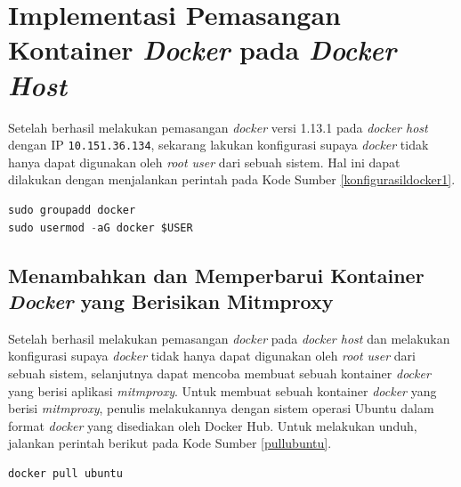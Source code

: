 \section{Implementasi Pemasangan Kontainer \textit{Docker} pada \textit{Docker Host}}
Setelah berhasil melakukan pemasangan \textit{docker} versi 1.13.1 pada \textit{docker host} dengan IP \texttt{10.151.36.134}, sekarang lakukan konfigurasi supaya \textit{docker} tidak hanya dapat digunakan oleh \textit{root user} dari sebuah sistem. Hal ini dapat dilakukan dengan menjalankan perintah pada Kode Sumber \ref{konfigurasildocker1}.
\newline
\begin{lstlisting}[frame=single,tabsize=2,breaklines,captionpos=b,caption=Perintah untuk installasi Ansible,language=Python,label=konfigurasildocker1]
sudo groupadd docker
sudo usermod -aG docker $USER
\end{lstlisting}

\subsection{Menambahkan dan Memperbarui Kontainer \textit{Docker} yang Berisikan Mitmproxy}
Setelah berhasil melakukan pemasangan \textit{docker} pada \textit{docker host} dan melakukan konfigurasi supaya \textit{docker} tidak hanya dapat digunakan oleh \textit{root user} dari sebuah sistem, selanjutnya dapat mencoba membuat sebuah kontainer \textit{docker} yang berisi aplikasi \textit{mitmproxy}. Untuk membuat sebuah kontainer \textit{docker} yang berisi \textit{mitmproxy}, penulis melakukannya dengan sistem operasi Ubuntu dalam format \textit{docker} yang disediakan oleh Docker Hub. Untuk melakukan unduh, jalankan perintah berikut pada Kode Sumber \ref{pullubuntu}.
\newline
\begin{lstlisting}[frame=single,tabsize=2,breaklines,captionpos=b,caption=Perintah untuk \textit{Pull} Ubuntu,language=Python,label=pullubuntu]
docker pull ubuntu
\end{lstlisting}

